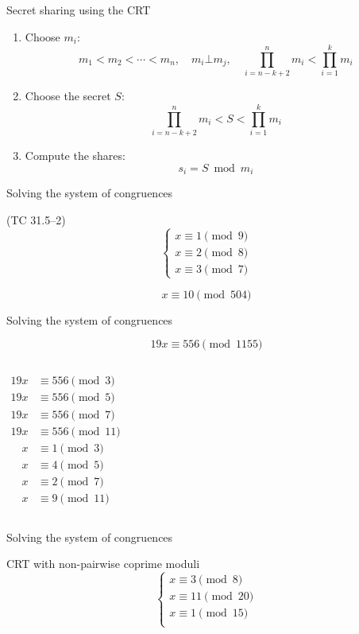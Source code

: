 \begin{frame}{Secret sharing using the CRT}
  \begin{enumerate}[<+->]
	\item Choose $m_i$:
	  \[
		m_1 < m_2 < \cdots < m_n, \quad m_i \bot m_j, \quad \prod_{i=n-k+2}^{n} m_i < \prod_{i=1}^{k} m_i
	  \]
	\item Choose the secret $S$:
	  \[
		\prod_{i=n-k+2}^{n} m_i < S < \prod_{i=1}^{k} m_i
	  \]
	\item Compute the shares:
	  \[
		s_i = S \bmod m_i
	  \]
  \end{enumerate}
\end{frame}
\begin{frame}{Solving the system of congruences}
  \begin{exampleblock}{(TC 31.5--2)}
	\[
	  \begin{cases}
		x \equiv 1 \pmod{9} \\
		x \equiv 2 \pmod{8} \\
		x \equiv 3 \pmod{7}
	  \end{cases}
	\]
  \end{exampleblock}

  \pause
  \[
	x \equiv 10 \pmod{504}
  \]
\end{frame}
\begin{frame}{Solving the system of congruences}
  \begin{exampleblock}{}
	\[
	  19x \equiv 556 \pmod{1155}
	\]
  \end{exampleblock}

  \begin{columns}
	  \pause
	  \begin{align*}
	    19x &\equiv 556 \pmod{3} \\
	    19x &\equiv 556 \pmod{5} \\
	    19x &\equiv 556 \pmod{7} \\
	    19x &\equiv 556 \pmod{11}
	  \end{align*}
	  \pause
	  \begin{align*}
		x &\equiv 1 \pmod{3} \\
		x &\equiv 4 \pmod{5} \\
		x &\equiv 2 \pmod{7} \\
		x &\equiv 9 \pmod{11}
	  \end{align*}
  \end{columns}
\end{frame}
\begin{frame}{Solving the system of congruences}
  \begin{exampleblock}{CRT with non-pairwise coprime moduli}
	\[
	  \begin{cases}
		x \equiv 3 \pmod{8} \\
		x \equiv 11 \pmod{20} \\
		x \equiv 1 \pmod{15} \\
	  \end{cases}
	\]
  \end{exampleblock}
\end{frame}

